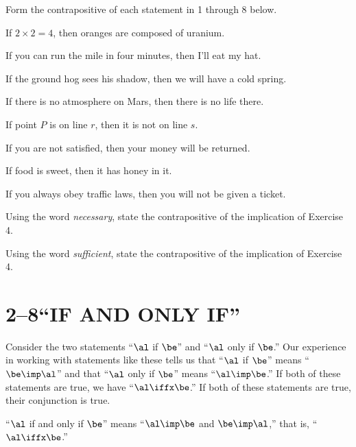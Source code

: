 \documentclass[11pt]{book}
\theoremstyle{bkplain}
\theoremstyle{XIplainnote}
\theoremstyle{bkplain}
\theoremstyle{bkplain}
\begin{document}

Form the contrapositive of each statement in 1 through 8 below.

\begin{exercisecols}
\begin{exlist}
\item If $2 \times 2 = 4$, then oranges are composed of uranium.
\item If you can run the mile in four minutes, then I'll eat my hat.
\item If the ground hog sees his shadow, then we will have a cold spring.
\item If there is no atmosphere on Mars, then there is no life there.
\item If point $P$ is on line $r$, then it is not on line $s$.
\item If you are not satisfied, then your money will be returned.
\item If food is sweet, then it has honey in it.
\item If you always obey traffic laws, then you will not be given a ticket.
\item[\stex 9.] Using the word \emph{necessary}, state the contrapositive of the
      implication of Exercise 4.
\item[\stex 10.] Using the word \emph{sufficient}, state the contrapositive of the
      implication of Exercise 4.
\end{exlist}
\end{exercisecols}

\section*{2--8\quad ``IF AND ONLY IF''}

Consider the two statements ``$\al$ if $\be$'' and ``$\al$ only if $\be$.'' Our
experience in working with statements like these tells us that ``$\al$ if $\be$''
means ``$\be \imp \al$'' and that ``$\al$ only if $\be$'' means ``$\al \imp \be$.''
If both of these statements are true, we have ``$\al \iffx \be$.'' If both of
these statements are true, their conjunction is true.

\begin{definition}
``$\al$ if and only if $\be$'' means ``$\al \imp \be$ and $\be \imp \al$,'' that
is, ``$\al \iffx \be$.''
\end{definition}
\end{document}
